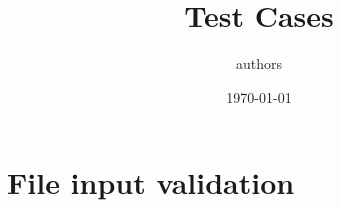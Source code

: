 \documentclass[12pt,a4paper]{article}
\title{Test Cases}
\author{authors}
\date{\today}
\begin{document}
	\maketitle
	
	\section{File input validation}
	
	
\end{document}
